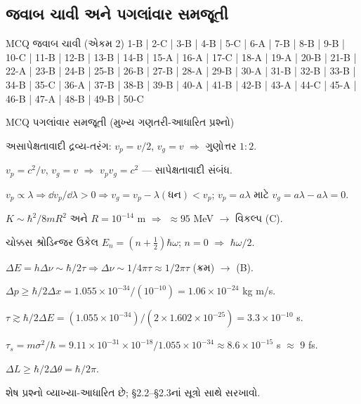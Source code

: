 \subsection*{જવાબ ચાવી અને પગલાંવાર સમજૂતી}
\begin{javabchavi}{MCQ જવાબ ચાવી (એકમ 2)}
1-B | 2-C | 3-B | 4-B | 5-C | 6-A | 7-B | 8-B | 9-B | 10-C |
11-B | 12-B | 13-B | 14-B | 15-A | 16-A | 17-C | 18-A | 19-A | 20-B |
21-B | 22-A | 23-B | 24-B | 25-B | 26-B | 27-B | 28-A | 29-B | 30-A |
31-B | 32-B | 33-B | 34-B | 35-C | 36-A | 37-B | 38-B | 39-B | 40-A |
41-B | 42-B | 43-A | 44-C | 45-A | 46-B | 47-A | 48-B | 49-B | 50-C
\end{javabchavi}

\begin{javabchavi}{MCQ પગલાંવાર સમજૂતી (મુખ્ય ગણતરી-આધારિત પ્રશ્નો)}
\begin{description}[style=nextline,itemsep=0pt]
  \item[3.] અસાપેક્ષતાવાદી દ્રવ્ય-તરંગ: $v_p=v/2$, $v_g=v$ $\Rightarrow$ ગુણોત્તર $1{:}2$.
  \item[4.] $v_p=c^2/v$, $v_g=v$ $\Rightarrow$ $v_pv_g=c^2$ — સાપેક્ષતાવાદી સંબંધ.
  \item[6.] $v_p\propto\lambda\Rightarrow\dd v_p/\dd\lambda>0\Rightarrow v_g=v_p-\lambda(\text{ધન})<v_p$; $v_p=a\lambda$ માટે $v_g=a\lambda-a\lambda=0$.
  \item[17.] $K\sim\hbar^2/8mR^2$ અને $R=10^{-14}$ m $\Rightarrow$ $\approx95$ MeV $\to$ વિકલ્પ (C).
  \item[20.] ચોક્કસ શ્રોડિન્જર ઉકેલ $E_n=(n+\tfrac12)\hbar\omega$; $n=0$ $\Rightarrow$ $\hbar\omega/2$.
  \item[23.] $\Delta E=h\Delta\nu\sim\hbar/2\tau\Rightarrow\Delta\nu\sim1/4\pi\tau\approx1/2\pi\tau$ (ક્રમ) $\to$ (B).
  \item[28.] $\Delta p\ge\hbar/2\Delta x=1.055\times10^{-34}/(10^{-10})=1.06\times10^{-24}$ kg m/s.
  \item[40.] $\tau\gtrsim\hbar/2\Delta E=(1.055\times10^{-34})/(2\times1.602\times10^{-25})=3.3\times10^{-10}$ s.
  \item[46.] $\tau_s=m\sigma^{2}/\hbar=9.11\times10^{-31}\times10^{-18}/1.055\times10^{-34}\approx8.6\times10^{-15}$ s $\approx$ 9 fs.
  \item[47.] $\Delta L\ge\hbar/2\Delta\theta=\hbar/2\pi$.
\end{description}
શેષ પ્રશ્નો વ્યાખ્યા-આધારિત છે; \S2.2--\S2.3નાં સૂત્રો સાથે સરખાવો.
\end{javabchavi}
